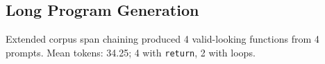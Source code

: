 \subsection{Long Program Generation}
Extended corpus span chaining produced 4 valid-looking functions from 4 prompts.
Mean tokens: 34.25; 4 with \texttt{return}, 2 with loops.
